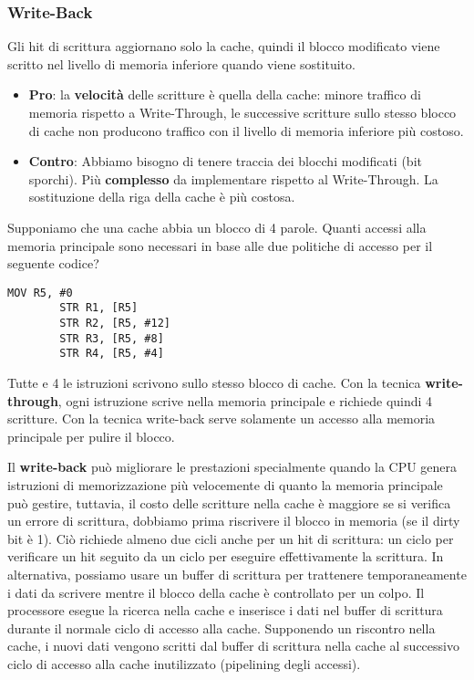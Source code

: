 \subsubsection{Write-Back}
Gli hit di scrittura aggiornano solo la cache, quindi il blocco modificato viene scritto nel livello di memoria inferiore quando viene sostituito. 
\begin{itemize}
	\item \textbf{Pro}: la \textbf{velocità} delle scritture è quella della cache: minore traffico di memoria rispetto a Write-Through, le successive scritture sullo stesso blocco di cache non producono traffico con il livello di memoria inferiore più costoso.
	\item \textbf{Contro}: 
	Abbiamo bisogno di tenere traccia dei blocchi modificati (bit sporchi). Più \textbf{complesso} da implementare rispetto al Write-Through. La sostituzione della riga della cache è più costosa.
\end{itemize}

\begin{example}
	Supponiamo che una cache abbia un blocco di 4 parole. Quanti accessi alla memoria principale sono necessari in base alle due politiche di accesso per il seguente codice?
	\begin{lstlisting}[language={[x86masm]Assembler}]
		MOV R5, #0
		STR R1, [R5]
		STR R2, [R5, #12]
		STR R3, [R5, #8]
		STR R4, [R5, #4]
	\end{lstlisting}
	Tutte e 4 le istruzioni scrivono sullo stesso blocco di cache. Con la tecnica \textbf{write-through}, ogni istruzione scrive nella memoria principale e richiede quindi 4 scritture. Con la tecnica write-back serve solamente un accesso alla memoria principale per pulire il blocco.
\end{example}

Il \textbf{write-back} può migliorare le prestazioni specialmente quando la CPU genera istruzioni di memorizzazione più velocemente di quanto la memoria principale può gestire, tuttavia, il costo delle scritture nella cache è maggiore se si verifica un errore di scrittura, dobbiamo prima riscrivere il blocco in memoria (se il dirty bit è 1). 
Ciò richiede almeno due cicli anche per un hit di scrittura: un ciclo per verificare un hit seguito da un ciclo per eseguire effettivamente la scrittura. In alternativa, possiamo usare un buffer di scrittura per trattenere temporaneamente i dati da scrivere mentre il blocco della cache è controllato per un colpo. 
Il processore esegue la ricerca nella cache e inserisce i dati nel buffer di scrittura durante il normale ciclo di accesso alla cache. Supponendo un riscontro nella cache, i nuovi dati vengono scritti dal buffer di scrittura nella cache al successivo ciclo di accesso alla cache inutilizzato (pipelining degli accessi).

